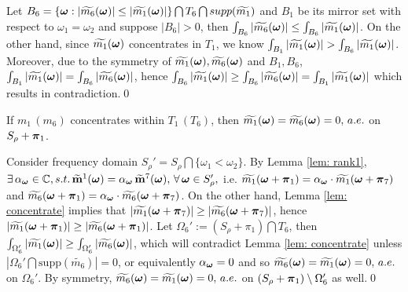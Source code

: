 Let $B_6=\{\V{\omega}: |\m{6}| \leq |\m{1}|\}\bigcap T_6\bigcap supp(\widetilde{m_1})$ and $B_1$ be its mirror set with respect to $\omega_1 = \omega_2$ and suppose $|B_6|>0$, then $\int_{B_6}|\m{6}|\leq \int_{B_6}|\m{1}|$. On the other hand, since $\m{1}$ concentrates in $T_1$, we know $\int_{B_1}|\m{1}| > \int_{B_6}|\m{1}|$. Moreover, due to the symmetry of $\m{1},\m{6}$ and $B_1,B_6$, $\int_{B_1}|\m{1}| = \int_{B_6}|\m{6}|$, hence $\int_{B_6}|\m{1}| \geq\int_{B_6}|\m{6}| = \int_{B_1}|\m{1}| $ which results in contradiction.\qed

\begin{proposition}
If  $m_1\,(m_6)$ concentrates within $T_1\,(T_6)$, then $\m{1} = \m{6} = 0,\, a.e. $ on $ S_\rho + \V{\pi}_1$.
\end{proposition}
Consider frequency domain $S_\rho' = S_\rho\bigcap\{\omega_1<\omega_2\}.$ By Lemma \ref{lem: rank1}, $\exists\,\alpha_{\V{\omega}}\in\mathbb{C}, s.t.\,\mrow{1}(\V{\omega}) = \alpha_{\V{\omega}}\,\mrow{7}(\V{\omega}),\, \forall\, \V{\omega}\in S_\rho',$ i.e. $\widetilde{m_1}(\V{\omega} + \V{\pi}_1) = \alpha_{\V{\omega}}\cdot\widetilde{m_1}(\V{\omega} + \V{\pi}_7)$ and $\widetilde{m_6}(\V{\omega} + \V{\pi}_1) = \alpha_{\V{\omega}}\cdot\widetilde{m_6}(\V{\omega} + \V{\pi}_7)$. On the other hand, Lemma \ref{lem: concentrate} implies that $|\widetilde{m_1}(\V{\omega} + \V{\pi}_7)| \geq |\widetilde{m_6}(\V{\omega} + \V{\pi}_7)|$, hence $|\widetilde{m_1}(\V{\omega} + \V{\pi}_1)| \geq |\widetilde{m_6}(\V{\omega} + \V{\pi}_1)|$. Let $\Omega_6':= (S_\rho+\pi_1)\bigcap T_6$, then $\int_{\Omega_6'}|\m{1}| \geq\int_{\Omega_6'}|\m{6}|$, which will contradict Lemma \ref{lem: concentrate} unless $|\Omega_6'\bigcap\text{supp}(\widetilde{m_6})| = 0$, or equivalently $\alpha_{\V{\omega}}=0$ and so $\m{6} = \m{1} = 0,\,a.e.$ on $\Omega_6'$. By symmetry, $\m{6}=\m{1} = 0,\,a.e. $ on $(S_\rho+\V{\pi}_1)\setminus \Omega_6'$ as well.\qed

